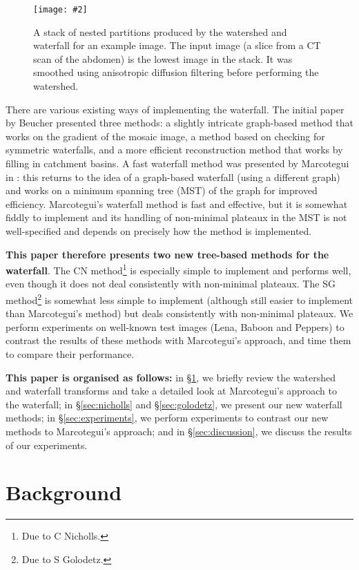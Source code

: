 \documentclass[a4paper]{article}
\newcommand{\stufigex}[5]					%
{
	\begin{figure}[#5]
	\begin{center}
		\texttt{[image: \#2]}
		\caption{#3}
		\label{#4}
	\end{center}
	\end{figure}
}
\begin{document}
\stufigex{height=18.5cm}{ipfs-ctconcept.png}{A stack of nested partitions produced by the watershed and waterfall for an example image. The input image (a slice from a CT scan of the abdomen) is the lowest image in the stack. It was smoothed using anisotropic diffusion filtering \cite{perona90} before performing the watershed.}{fig:ipfs-ctconcept}{p}

There are various existing ways of implementing the waterfall. The initial paper by Beucher \cite{beucher94} presented three methods: a slightly intricate graph-based method that works on the gradient of the mosaic image, a method based on checking for symmetric waterfalls, and a more efficient reconstruction method that works by filling in catchment basins. A fast waterfall method was presented by Marcotegui in \cite{marcotegui05}: this returns to the idea of a graph-based waterfall (using a different graph) and works on a minimum spanning tree (MST) of the graph for improved efficiency. Marcotegui's waterfall method is fast and effective, but it is somewhat fiddly to implement \cite{golodetz08} and its handling of non-minimal plateaux in the MST is not well-specified and depends on precisely how the method is implemented.

\textbf{This paper therefore presents two new tree-based methods for the waterfall}. The CN method\footnote{Due to C Nicholls.} is especially simple to implement and performs well, even though it does not deal consistently with non-minimal plateaux. The SG method\footnote{Due to S Golodetz.} is somewhat less simple to implement (although still easier to implement than Marcotegui's method) but deals consistently with non-minimal plateaux. We perform experiments on well-known test images (Lena, Baboon and Peppers) to contrast the results of these methods with Marcotegui's approach, and time them to compare their performance.

\textbf{This paper is organised as follows:} in \S\ref{sec:background}, we briefly review the watershed and waterfall transforms and take a detailed look at Marcotegui's approach to the waterfall; in \S\ref{sec:nicholls} and \S\ref{sec:golodetz}, we present our new waterfall methods; in \S\ref{sec:experiments}, we perform experiments to contrast our new methods to Marcotegui's approach; and in \S\ref{sec:discussion}, we discuss the results of our experiments.

\section{Background}
\label{sec:background}
\end{document}
